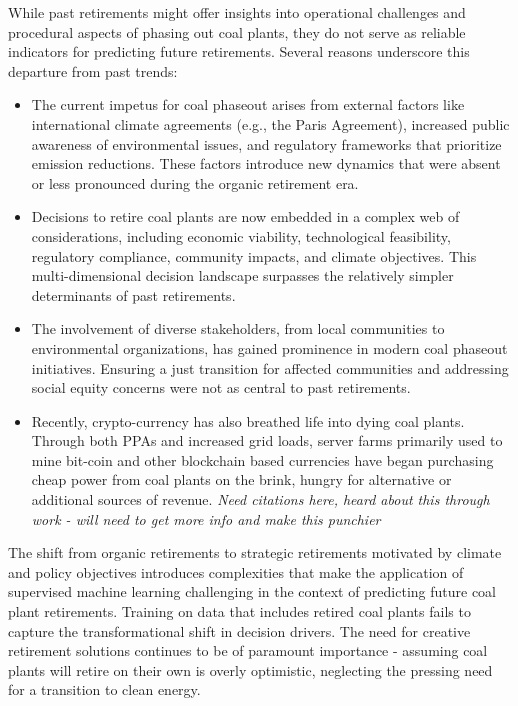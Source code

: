 \documentclass{article}
\begin{document}
While past retirements might offer insights into operational challenges and procedural aspects of phasing out 
coal plants, they do not serve as reliable indicators for predicting future retirements. Several reasons underscore 
this departure from past trends:

\begin{itemize}
    \item The current impetus for coal phaseout arises from external factors like international climate agreements (e.g., the Paris Agreement), increased public awareness of environmental issues, and regulatory frameworks that prioritize emission reductions. These factors introduce new dynamics that were absent or less pronounced during the organic retirement era.
    \item Decisions to retire coal plants are now embedded in a complex web of considerations, including economic viability, technological feasibility, regulatory compliance, community impacts, and climate objectives. This multi-dimensional decision landscape surpasses the relatively simpler determinants of past retirements.
    \item The involvement of diverse stakeholders, from local communities to environmental organizations, has gained prominence in modern coal phaseout initiatives. Ensuring a just transition for affected communities and addressing social equity concerns were not as central to past retirements.
    \item Recently, crypto-currency has also breathed life into dying coal plants. Through both PPAs and increased grid loads, server farms primarily used to mine bit-coin and other blockchain based currencies have began purchasing cheap power from coal plants on the brink, hungry for alternative or additional sources of revenue. \textit{Need citations here, heard about this through work - will need to get more info and make this punchier}
\end{itemize}

The shift from organic retirements to strategic retirements motivated by climate and policy objectives introduces complexities that make the application of supervised machine learning challenging in the context of predicting future coal plant retirements. Training on data that includes retired coal plants fails to capture the transformational shift in decision drivers. The need for creative retirement solutions continues to be of paramount importance - assuming coal plants will retire on their own is overly optimistic, neglecting the pressing need for a transition to clean energy.\\
\end{document}
